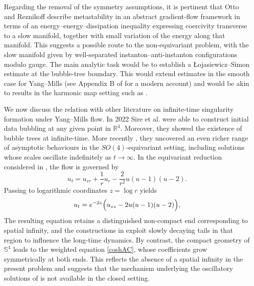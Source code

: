 \documentclass[11pt,a4paper]{article}
\numberwithin{equation}{section}
\theoremstyle{plain}
\theoremstyle{remark}
\begin{document}
Regarding the removal of the symmetry assumptions, it is pertinent that Otto and Reznikoff \cite{OttoReznikoff2006} describe metastability in an abstract gradient-flow framework in terms of an energy--energy--dissipation inequality expressing coercivity transverse to a slow manifold, together with small variation of the energy along that manifold. This suggests a possible route to the non-equivariant problem, with the slow manifold given by well-separated instanton--anti-instanton configurations modulo gauge. The main analytic task would be to establish a \L ojasiewicz--Simon estimate at the bubble-tree boundary. This would extend estimates in the smooth case for Yang--Mills (see Appendix B of \cite{dayaprema2026parabolicgaptheoremsyangmills} for a modern account) and would be akin to results in the harmonic map setting such as \cite{Rupflin2024Lojasiewicz}.


We now discuss the relation with other literature on infinite-time singularity formation under Yang--Mills flow. In 2022 Sire et al. \cite{SireWeiZheng2022} were able to construct initial data bubbling at any given point in $\mathbb{R}^4$. Moreover, they showed the existence of bubble trees at infinite-time. More recently \cite{sire2026globaloscillatorysolutionsyangmills}, they uncovered an even richer range of asymptotic behaviours in the $SO(4)$-equivariant setting, including solutions whose scales oscillate indefinitely as $t\to\infty$. In the equivariant reduction considered in \cite{sire2026globaloscillatorysolutionsyangmills}, the flow is governed by
$$
u_t=u_{rr}+\frac1r u_r-\frac{2}{r^2}u(u-1)(u-2).
$$
Passing to logarithmic coordinates $z=\log r$ yields
$$
u_t=e^{-2z}\Bigl(u_{zz}-2u(u-1)(u-2)\Bigr),
$$
The resulting equation retains a distinguished non-compact end corresponding to spatial infinity, and the constructions in \cite{sire2026globaloscillatorysolutionsyangmills} exploit slowly decaying tails in that region to influence the long-time dynamics. By contrast, the compact geometry of $\mathbb{S}^4$ leads to the weighted equation \eqref{coshAC}, whose coefficients grow symmetrically at both ends. This reflects the absence of a spatial infinity in the present problem and suggests that the mechanism underlying the oscillatory solutions of \cite{sire2026globaloscillatorysolutionsyangmills} is not available in the closed setting.
\end{document}
